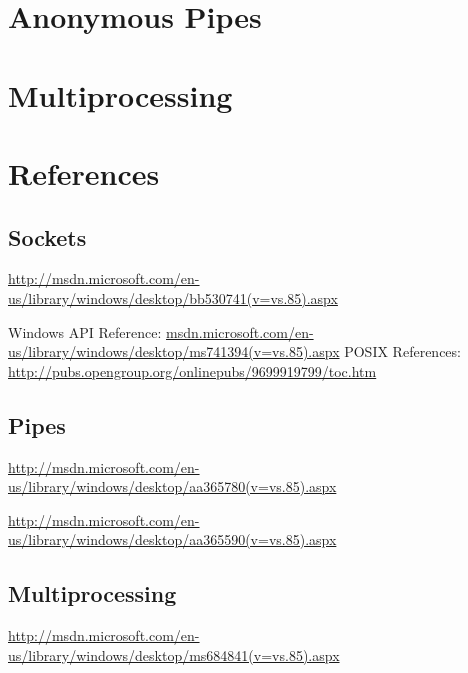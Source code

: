 \documentclass[letterpaper,10pt]{article}
\begin{document}
\begin{comment}
\subsection{close/closesocket}
Widows:
int closesocket(
  \_In\_  SOCKET s
);

POSIX:
int close(int fildes);

\subsection{send}
Windows:
int send(
  \_In\_  SOCKET s,
  \_In\_  const char *buf,
  \_In\_  int len,
  \_In\_  int flags
);

POSIX:
ssize\_t send(int socket, const void *buffer, size\_t length, int flags);

\subsection{recv}
Windows:
int recv(
  \_In\_   SOCKET s,
  \_Out\_  char *buf,
  \_In\_   int len,
  \_In\_   int flags
);

POSIX:
ssize\_t recv(int socket, void *buffer, size\_t length, int flags);

\end{comment}

\section{Anonymous Pipes}

\section{Multiprocessing}

\newpage

\section{References}

\subsection{Sockets}
\url{http://msdn.microsoft.com/en-us/library/windows/desktop/bb530741(v=vs.85).aspx}

Windows API Reference: \url{msdn.microsoft.com/en-us/library/windows/desktop/ms741394(v=vs.85).aspx}
POSIX References: \url{http://pubs.opengroup.org/onlinepubs/9699919799/toc.htm}

\subsection{Pipes}
\url{http://msdn.microsoft.com/en-us/library/windows/desktop/aa365780(v=vs.85).aspx}

\url{http://msdn.microsoft.com/en-us/library/windows/desktop/aa365590(v=vs.85).aspx}

\subsection{Multiprocessing}
\url{http://msdn.microsoft.com/en-us/library/windows/desktop/ms684841(v=vs.85).aspx}
\end{document}
